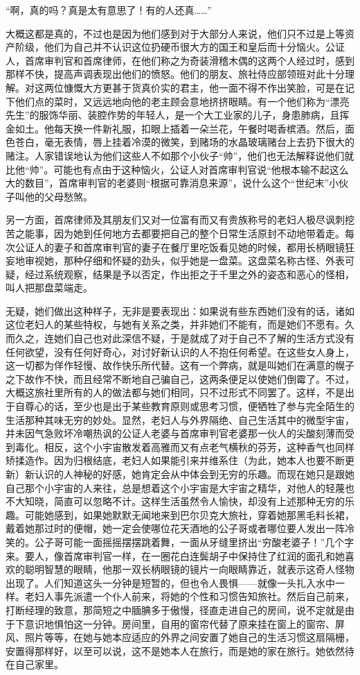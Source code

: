 \par “啊，真的吗？真是太有意思了！有的人还真……”
\par 大概这都是真的，不过也是因为他们感到对于大部分人来说，他们只不过是上等资产阶级，他们为自己并不认识这位扔硬币很大方的国王和皇后而十分恼火。公证人，首席审判官和首席律师，在他们称之为奇装滑稽木偶的这两个人经过时，感到那样不快，提高声调表现出他们的愤怒。他们的朋友、旅社侍应部领班对此十分理解。对这两位慷慨大方更甚于货真价实的君主，他一面不得不作出笑脸，可是在记下他们点的菜时，又远远地向他的老主顾会意地挤挤眼睛。有一个他们称为“漂亮先生”的服饰华丽、装腔作势的年轻人，是一个大工业家的儿子，身患肺病，且挥金如土。他每天换一件新礼服，扣眼上插着一朵兰花，午餐时喝香槟酒。然后，面色苍白，毫无表情，唇上挂着冷漠的微笑，到赌场的水晶玻璃赌台上去扔下很大的赌注。人家错误地认为他们这些人不如那个小伙子“帅”，他们也无法解释说他们就比他“帅”。可能也有点由于这种恼火，公证人对首席审判官说“他根本输不起这么大的数目”，首席审判官的老婆则“根据可靠消息来源”，说什么这个“世纪末”小伙子叫他的父母愁煞。
\par 另一方面，首席律师及其朋友们又对一位富有而又有贵族称号的老妇人极尽讽刺挖苦之能事，因为她到任何地方去都要把自己的整个日常生活原封不动地带着走。每次公证人的妻子和首席审判官的妻子在餐厅里吃饭看见她的时候，都用长柄眼镜狂妄地审视她，那种仔细和怀疑的劲头，似乎她是一盘菜。这盘菜名称古怪、外表可疑，经过系统观察，结果是予以否定，作出拒之于千里之外的姿态和恶心的怪相，叫人把那盘菜端走。
\par 无疑，她们做出这种样子，无非是要表现出：如果说有些东西她们没有的话，诸如这位老妇人的某些特权，与她有关系之类，并非她们不能有，而是她们不愿有。久而久之，连她们自己也对此深信不疑，于是就成了对于自己不了解的生活方式没有任何欲望，没有任何好奇心，对讨好新认识的人不抱任何希望。在这些女人身上，这一切都为佯作轻慢、故作快乐所代替。这有一个弊病，就是叫她们在满意的幌子之下故作不快，而且经常不断地自己骗自己，这两条便足以使她们倒霉了。不过，大概这旅社里所有的人的做法都与她们相同，只不过形式不同罢了。这样，不是出于自尊心的话，至少也是出于某些教育原则或思考习惯，便牺牲了参与完全陌生的生活那种其味无穷的妙处。显然，老妇人与外界隔绝、自己生活其中的微型宇宙，并未因气急败坏冷嘲热讽的公证人老婆与首席审判官老婆那一伙人的尖酸刻薄而受到毒化。相反，这个小宇宙散发着高雅而又有点老气横秋的芬芳，这种香气也同样矫揉造作。因为归根结底，老妇人如果能引来并维系住（为此，她本人也要不断更新）新认识的人神秘的好感，她肯定会从中体会到无穷的乐趣。而现在她只是跟她自己那个小宇宙的人来往，总是想着这个小宇宙是大宇宙之精华，对他人的轻蔑也不大知晓，简直可以忽略不计。这样生活虽然令人愉快，却没有上述那种无穷的乐趣。可能她感到，如果她默默无闻地来到巴尔贝克大旅社，穿着她那黑毛料长裙，戴着她那过时的便帽，她一定会使哪位花天酒地的公子哥或者哪位要人发出一阵冷笑的。公子哥可能一面摇摇摆摆跳着舞，一面从牙缝里挤出“穷酸老婆子！”几个字来。要人，像首席审判官一样，在一圈花白连鬓胡子中保持住了红润的面孔和她喜欢的聪明智慧的眼睛，他那一双长柄眼镜的镜片一向眼睛靠近，就表示这奇人怪物出现了。人们知道这头一分钟是短暂的，但也令人畏惧——就像一头扎入水中一样。老妇人事先派遣一个仆人前来，将她的个性和习惯告知旅社。然后自己前来，打断经理的致意，那简短之中腼腆多于傲慢，径直走进自己的房间，说不定就是由于下意识地惧怕这一分钟。房间里，自用的窗帘代替了原来挂在窗上的窗帘、屏风、照片等等，在她与她本应适应的外界之间安置了她自己的生活习惯这扇隔栅，安置得那样好，以至可以说，这不是她本人在旅行，而是她的家在旅行。她依然待在自己家里。
